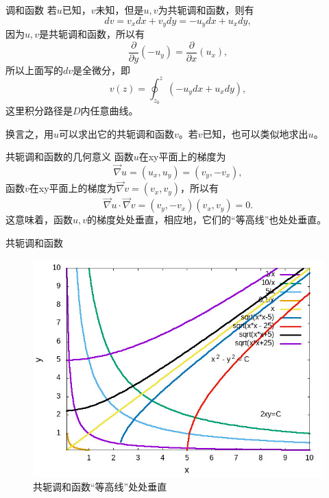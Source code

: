 \documentclass[11pt]{beamer}
\newcommand{\kong}[1][0.5]{\vspace{#1cm}}
\begin{document}
\begin{frame}{调和函数}
若$u$已知，$v$未知，但是$u,v$为共轭调和函数，则有
\begin{equation}
dv = v_x dx + v_y dy = - u_y dx + u_x dy,
\end{equation}
因为$u,v$是共轭调和函数，所以有
\begin{equation}
\frac{\partial}{\partial y}(- u_y) = \frac{\partial}{\partial x} (u_x),
\end{equation}
所以上面写的$dv$是全微分，即
\begin{equation}
v(z) = \oint^z_{z_0}(-u_y dx + u_x dy),
\end{equation}
这里积分路径是$D$内任意曲线。

\kong[0.5]
换言之，用$u$可以求出它的共轭调和函数$v$。若$v$已知，也可以类似地求出$u$。
\end{frame}

\begin{frame}{共轭调和函数的几何意义}
函数$u$在xy平面上的梯度为
\begin{equation}
\vec{\nabla}u = (u_x, u_y) = (v_y, - v_x),
\end{equation}
函数$v$在xy平面上的梯度为$\vec{\nabla} v = (v_x, v_y)$，所以有
\begin{equation}
\vec{\nabla}u \cdot \vec{\nabla} v = (v_y, -v_x)(v_x, v_y) = 0.
\end{equation}
这意味着，函数$u,v$的梯度处处垂直，相应地，它们的“等高线”也处处垂直。
\end{frame}

\begin{frame}{共轭调和函数}
\begin{figure}
	\centering
	\includegraphics[width=0.6\linewidth, height=0.6\linewidth]{chap2_01.jpeg}
	\caption{共轭调和函数“等高线”处处垂直}
	\label{fig:chap201}
\end{figure}
\end{frame}
\end{document}
